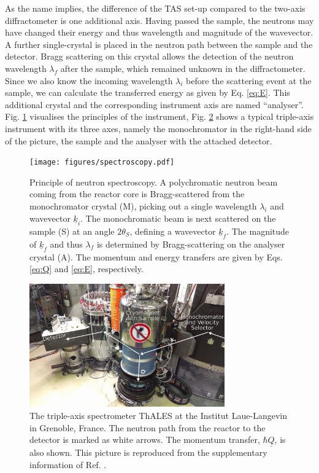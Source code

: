 As the name implies, the difference of the TAS set-up compared to the two-axis diffractometer is one additional axis.
Having passed the sample, the neutrons may have changed their energy and thus wavelength and magnitude of the wavevector.
A further single-crystal is placed in the neutron path between the sample and the detector. Bragg scattering on this crystal
allows the detection of the neutron wavelength $\lambda_f$ after the sample, which remained unknown in the diffractometer.
Since we also know the incoming wavelength $\lambda_i$ before the scattering event at the sample, we can calculate the
transferred energy as given by Eq. \ref{eq:E}. This additional crystal and the corresponding instrument axis are named ``analyser''.
Fig. \ref{fig:spectroscopy} visualises the principles of the instrument, Fig. \ref{fig:thales} shows a typical triple-axis
instrument with its three axes, namely the monochromator in the right-hand side of the picture, the sample and the analyser
with the attached detector.

\begin{figure}[htb]
	\centering
	\texttt{[image: figures/spectroscopy.pdf]}
	\caption[Neutron spectroscopy.]{
		Principle of neutron spectroscopy. A polychromatic neutron beam coming from the reactor core is Bragg-scattered
		from the monochromator crystal (M), picking out a single wavelength $\lambda_i$ and wavevector $\underline{k}_i$.
		The monochromatic beam is next scattered on the sample (S) at an angle $2\theta_S$, defining a wavevector $\underline{k}_f$.
		The magnitude of $\underline{k}_f$ and thus $\lambda_f$ is determined by Bragg-scattering on the analyser crystal (A).
		The momentum and energy transfers are given by Eqs. \ref{eq:Q} and \ref{eq:E}, respectively. }
	\label{fig:spectroscopy}
\end{figure}

\begin{figure}[htb]
	\centering
	\includegraphics[width=0.75\textwidth]{figures/thales.jpg}
	\caption[The Thales instrument at the ILL.]{
		The triple-axis spectrometer ThALES \cite{thales} at the Institut Laue-Langevin in Grenoble, France. The neutron
		path from the reactor to the detector is marked as white arrows. The momentum transfer, $\hbar \underline{Q}$,
		is also shown. This picture is reproduced from the supplementary information of Ref. \cite{skxpaper}.}
	\label{fig:thales}
\end{figure}



